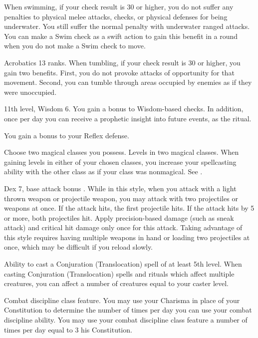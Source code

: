 When swimming, if your check result is 30 or higher, you do not suffer any penalties to physical melee attacks, checks, or physical defenses for being underwater. You still suffer the normal penalty with underwater ranged attacks. You can make a Swim check as a swift action to gain this benefit in a round when you do not make a Swim check to move.

\featpre Acrobatics 13 ranks.
\featben When tumbling, if your check result is 30 or higher, you gain two benefits. First, you do not provoke attacks of opportunity for that movement. Second, you can tumble through areas occupied by enemies as if they were unoccupied.

\featpre 11th level, Wisdom 6.
\featben You gain a  bonus to Wisdom-based checks. In addition, once per day you can receive a prophetic insight into future events, as the  ritual.

 You gain a  bonus to your Reflex defense.

Choose two magical classes you possess.
 Levels in two magical classes.
 When gaining levels in either of your chosen classes, you increase your spellcasting ability with the other class as if your class was nonmagical. See .

 Dex 7, base attack bonus .
 While in this style, when you attack with a light thrown weapon or projectile weapon, you may attack with two projectiles or weapons at once. If the attack hits, the first projectile hits. If the attack hits by 5 or more, both projectiles hit. Apply precision-based damage (such as sneak attack) and critical hit damage only once for this attack. Taking advantage of this style requires having multiple weapons in hand or loading two projectiles at once, which may be difficult if you reload slowly.

\featpre Ability to cast a Conjuration (Translocation) spell of at least 5th level.
\featben When casting Conjuration (Translocation) spells and rituals which affect multiple creatures, you can affect a number of creatures equal to your caster level.

\featpre Combat discipline class feature.
\featben You may use your Charisma in place of your Constitution to determine the number of times per day you can use your combat discipline ability.
 You may use your combat discipline class feature a number of times per day equal to 3 \add his Constitution.

